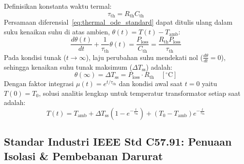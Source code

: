 \documentclass[11pt,a4paper]{article}
\theoremstyle{definition}
\begin{document}
Definisikan konstanta waktu termal:
\begin{equation}
    \tau_{\text{th}} = R_{\text{th}} C_{\text{th}}
    \label{eq:thermal_time_constant}
\end{equation}
Persamaan diferensial~\eqref{eq:thermal_ode_standard} dapat ditulis ulang dalam suku kenaikan suhu di atas ambien, $\theta(t) = T(t) - T_{\text{amb}}$:
\begin{equation}
    \frac{d\theta(t)}{dt} + \frac{1}{\tau_{\text{th}}} \theta(t) = \frac{P_{\text{loss}}}{C_{\text{th}}} = \frac{R_{\text{th}} P_{\text{loss}}}{\tau_{\text{th}}}
\end{equation}
Pada kondisi tunak ($t \to \infty$), laju perubahan suhu mendekati nol ($\frac{d\theta}{dt} = 0$), sehingga kenaikan suhu tunak maksimum ($\Delta T_{\text{ss}}$) adalah:
\begin{equation}
    \theta(\infty) = \Delta T_{\text{ss}} = P_{\text{loss}} \cdot R_{\text{th}} \quad [^\circ\text{C}]
    \label{eq:steady_state_temp_rise}
\end{equation}
Dengan faktor integrasi $\mu(t) = e^{t/\tau_{\text{th}}}$ dan kondisi awal saat $t = 0$ yaitu $T(0) = T_0$, solusi analitis lengkap untuk temperatur transformator setiap saat adalah:
\begin{equation}
    T(t) = T_{\text{amb}} + \Delta T_{\text{ss}} \left( 1 - e^{-\frac{t}{\tau_{\text{th}}}} \right) + (T_0 - T_{\text{amb}}) e^{-\frac{t}{\tau_{\text{th}}}}
    \label{eq:thermal_complete_solution}
\end{equation}

\subsection{Standar Industri IEEE Std C57.91: Penuaan Isolasi \& Pembebanan Darurat}
\end{document}
